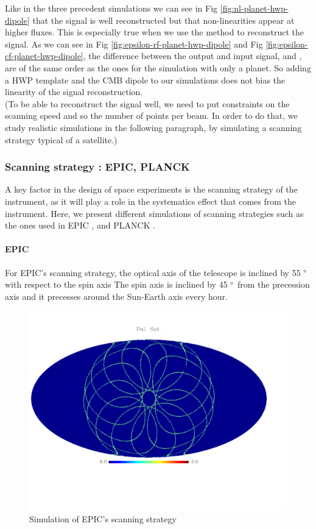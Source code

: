 Like in the three precedent simulations we can see in Fig \ref{fig:nl-planet-hwp-dipole} that the signal is well reconstructed but that non-linearities appear at higher fluxes. This is especially true when we use the \rf method to reconstruct the signal. As we can see in Fig \ref{fig:epsilon-rf-planet-hwp-dipole} and Fig \ref{fig:epsilon-cf-planet-hwp-dipole}, the difference between the output and input signal, and \eps, are of the same order as the ones for the simulation with only a planet. So adding a HWP template and the CMB dipole to our simulations does not bias the linearity of the signal reconstruction.\\

(To be able to reconstruct the signal well, we need to put constraints on the scanning speed and so the number of points per beam. In order to do that, we study realistic simulations in the following paragraph, by simulating a scanning strategy typical of a satellite.) 



\subsubsection{Scanning strategy : EPIC, PLANCK}
A key factor in the design of space experiments is the scanning strategy of the instrument, as it will play a role in the systematics effect that comes from the instrument. Here, we present different simulations of scanning strategies such as the ones used in EPIC \citep{2009arXiv0906.1188B}, and PLANCK \citep{2005A&A...430..363D}.

\paragraph{EPIC \\}
For EPIC's scanning strategy, the optical axis of the telescope is inclined by 55 $\degree$ with respect to the spin axis The spin axis is inclined by 45 $\degree$ from the precession axis and it precesses around the Sun-Earth axis every hour.

\begin{figure}[h]
\center
	\includegraphics[scale=0.3]{Figures/scan_strat_epic.pdf}
	\caption{Simulation of EPIC's scanning strategy}
	\label{fig:strat_epic}
\end{figure}

